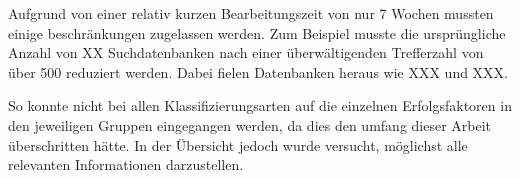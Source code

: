 Aufgrund von einer relativ kurzen Bearbeitungszeit von nur 7 Wochen mussten einige beschränkungen zugelassen werden.
Zum Beispiel musste die ursprüngliche Anzahl von XX Suchdatenbanken nach einer überwältigenden Trefferzahl von über 500
reduziert werden. Dabei fielen Datenbanken heraus wie XXX und XXX.

So konnte nicht bei allen Klassifizierungsarten auf die einzelnen Erfolgsfaktoren in den jeweiligen Gruppen eingegangen werden, da
dies den umfang dieser Arbeit überschritten hätte. In der Übersicht jedoch wurde versucht, möglichst alle relevanten Informationen darzustellen.